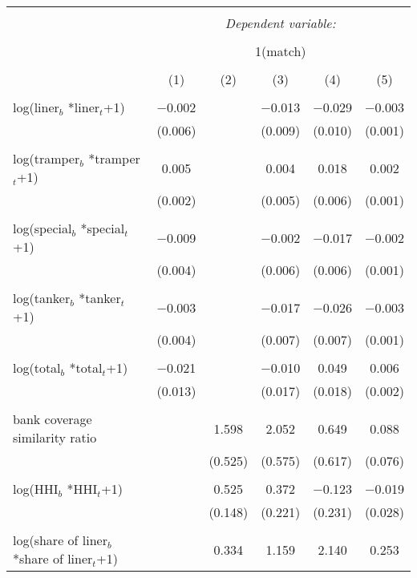 
\begin{tabular}{@{\extracolsep{5pt}}lccccc} 
\\[-1.8ex]\hline 
\hline \\[-1.8ex] 
 & \multicolumn{5}{c}{\textit{Dependent variable:}} \\ 
\cline{2-6} 
\\[-1.8ex] & \multicolumn{5}{c}{1(match)} \\ 
\\[-1.8ex] & (1) & (2) & (3) & (4) & (5)\\ 
\hline \\[-1.8ex] 
 log(liner$_{b}$ *liner$_{t}$+1) & $-$0.002 &  & $-$0.013 & $-$0.029 & $-$0.003 \\ 
  & (0.006) &  & (0.009) & (0.010) & (0.001) \\ 
  & & & & & \\ 
 log(tramper$_{b}$ *tramper$_{t}$+1) & 0.005 &  & 0.004 & 0.018 & 0.002 \\ 
  & (0.002) &  & (0.005) & (0.006) & (0.001) \\ 
  & & & & & \\ 
 log(special$_{b}$ *special$_{t}$+1) & $-$0.009 &  & $-$0.002 & $-$0.017 & $-$0.002 \\ 
  & (0.004) &  & (0.006) & (0.006) & (0.001) \\ 
  & & & & & \\ 
 log(tanker$_{b}$ *tanker$_{t}$+1) & $-$0.003 &  & $-$0.017 & $-$0.026 & $-$0.003 \\ 
  & (0.004) &  & (0.007) & (0.007) & (0.001) \\ 
  & & & & & \\ 
 log(total$_{b}$ *total$_{t}$+1) & $-$0.021 &  & $-$0.010 & 0.049 & 0.006 \\ 
  & (0.013) &  & (0.017) & (0.018) & (0.002) \\ 
  & & & & & \\ 
 bank coverage similarity ratio &  & 1.598 & 2.052 & 0.649 & 0.088 \\ 
  &  & (0.525) & (0.575) & (0.617) & (0.076) \\ 
  & & & & & \\ 
 log(HHI$_{b}$ *HHI$_{t}$+1) &  & 0.525 & 0.372 & $-$0.123 & $-$0.019 \\ 
  &  & (0.148) & (0.221) & (0.231) & (0.028) \\ 
  & & & & & \\ 
 log(share of liner$_{b}$ *share of liner$_{t}$+1) &  & 0.334 & 1.159 & 2.140 & 0.253 \\ 

\end{tabular}
